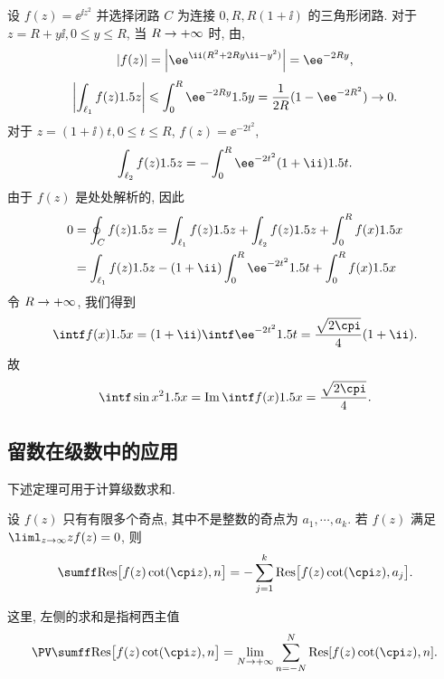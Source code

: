 \begin{solution}
  设 $f(z)=\ee^{\ii z^2}$ 并选择闭路 $C$ 为连接 $0,R,R(1+\ii)$ 的三角形闭路.
  对于 $z=R+y\ii,0\le y\le R$, 当 $R\rightarrow+\infty$ 时, 由\thmGrowUp,
  \[
    |f(z)|=\abs{\ee^{\ii (R^2+2Ry\ii-y^2)}}=\ee^{-2Ry},
  \]
  \[
     \abs{\int_{\ell_1}f(z)\d z}
    \le \int_0^R \ee^{-2Ry}\d y
    =\frac1{2R}(1-\ee^{-2R^2})\ra 0.
  \]
  对于 $z=(1+\ii)t,0\le t\le R$, $f(z)=\ee^{-2t^2}$,
  \[
     \int_{\ell_2} f(z)\d z
    =-\int_0^R \ee^{-2t^2}(1+\ii)\d t.
  \]
  由于 $f(z)$ 是处处解析的, 因此
  \begin{align*}
     0&
    =\oint_Cf(z)\d z
    =\int_{\ell_1} f(z)\d z+\int_{\ell_2} f(z)\d z
    +\int_0^R f(x)\d x\\&
    =\int_{\ell_1} f(z)\d z-(1+\ii)\int_0^R\ee^{-2t^2}\d t
    +\int_0^R f(x)\d x
  \end{align*}
  令 $R\rightarrow+\infty$, 我们得到
  \[
     \intf f(x)\d x
    =(1+\ii)\intf \ee^{-2t^2}\d t
    =\frac{\sqrt{2\cpi}}4(1+\ii).
  \]
  故
  \[
     \intf\sin x^2\d x
    =\Im \intf f(x)\d x
    =\frac{\sqrt{2\cpi}}4.
  \]
\end{solution}


\subsection{留数在级数中的应用}

下述定理可用于计算级数求和.
\begin{theorem}
  \label{thm:sum-fcot-residue-zero}
  设 $f(z)$ 只有有限多个奇点, 其中不是整数的奇点为 $a_1,\cdots,a_k$.
  若 $f(z)$ 满足 $\liml_{z\ra\infty}zf(z)=0$, 则
  \[
    \sumff \Res\bigl[f(z)\cot(\cpi z),n\bigr]
    =-\sum_{j=1}^k \Res\bigl[f(z)\cot(\cpi z),a_j\bigr].
  \]
\end{theorem}
这里, 左侧的求和是指柯西主值
\[
  \PV\sumff \Res\bigl[f(z)\cot(\cpi z),n\bigr]
  =\lim_{N\ra+\infty}\sum_{n=-N}^N \Res[f(z)\cot(\cpi z),n].
\]

